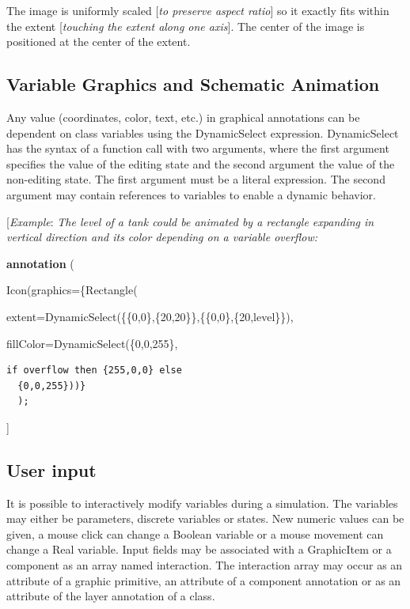 \documentclass[10pt,a4paper]{report}
\def\doublelabel#1{\label{#1}\hypertarget{#1}{}}
\begin{document}
The image is uniformly scaled {[}\emph{to preserve aspect ratio}{]} so
it exactly fits within the extent {[}\emph{touching the extent along one
axis}{]}. The center of the image is positioned at the center of the
extent.

\subsection{Variable Graphics and Schematic Animation}\doublelabel{variable-graphics-and-schematic-animation}

Any value (coordinates, color, text, etc.) in graphical annotations can
be dependent on class variables using the DynamicSelect expression.
DynamicSelect has the syntax of a function call with two arguments,
where the first argument specifies the value of the editing state and
the second argument the value of the non-editing state. The first
argument must be a literal expression. The second argument may contain
references to variables to enable a dynamic behavior.

{[}\emph{Example}: \emph{The level of a tank could be animated by a
rectangle expanding in vertical direction and its color depending on a
variable overflow:}

\textbf{annotation} (

Icon(graphics=\{Rectangle(

extent=DynamicSelect(\{\{0,0\},\{20,20\}\},\{\{0,0\},\{20,level\}\}),

fillColor=DynamicSelect(\{0,0,255\},

\begin{lstlisting}[language=modelica]
if overflow then {255,0,0} else
  {0,0,255}))}
  );
\end{lstlisting}
{]}

\subsection{User input}\doublelabel{user-input}

It is possible to interactively modify variables during a simulation.
The variables may either be parameters, discrete variables or states.
New numeric values can be given, a mouse click can change a Boolean
variable or a mouse movement can change a Real variable. Input fields
may be associated with a GraphicItem or a component as an array named
interaction. The interaction array may occur as an attribute of a
graphic primitive, an attribute of a component annotation or as an
attribute of the layer annotation of a class.
\end{document}
